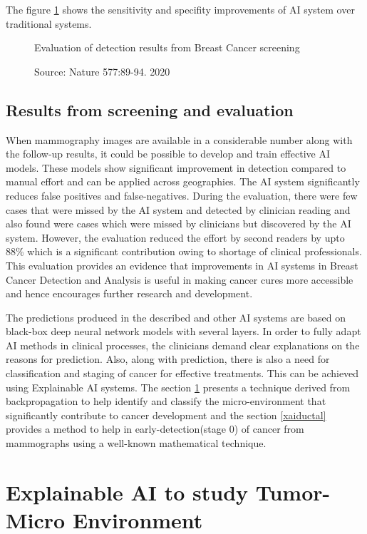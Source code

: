 \documentclass[sigconf, language=english]{acmart}
\begin{document}
The figure \ref{aieval} shows the sensitivity and specifity improvements of AI system over traditional systems. 

\begin{figure} [ht]
  \centering
    \caption{Evaluation of detection results from Breast Cancer screening}
    \caption*{Source: Nature 577:89-94. 2020}
  \label{aieval}
\end{figure}


\subsection{Results from screening and evaluation}

When mammography images are available in a considerable number along with the follow-up results, it could be possible to develop and train effective AI models. These models show significant improvement in detection compared to manual effort and can be applied across geographies. The AI system significantly reduces false positives and false-negatives. During the evaluation, there were few cases that were missed by the AI system and detected by clinician reading and also found were cases which were missed by clinicians but discovered by the AI system. However, the evaluation reduced the effort by second readers by upto 88\% which is a significant contribution owing to shortage of clinical professionals. This evaluation provides an evidence that improvements in AI systems in Breast Cancer Detection and Analysis is useful in making cancer cures more accessible and hence encourages further research and development.

The predictions produced in the described and other AI systems are based on black-box deep neural network models with several layers. In order to fully adapt AI methods in clinical processes, the clinicians demand clear explanations on the reasons for prediction. Also, along with prediction, there is also a need for classification and staging of cancer for effective treatments. This can be achieved using Explainable AI systems. The section \ref{xaixgboost} presents a technique derived from backpropagation to help identify and classify the micro-environment that significantly contribute to cancer development and the section \ref{xaiductal} provides a method to help in early-detection(stage 0) of cancer from mammographs using a well-known mathematical technique.


\section{Explainable AI to study Tumor-Micro Environment}
\label{xaixgboost}
\end{document}
